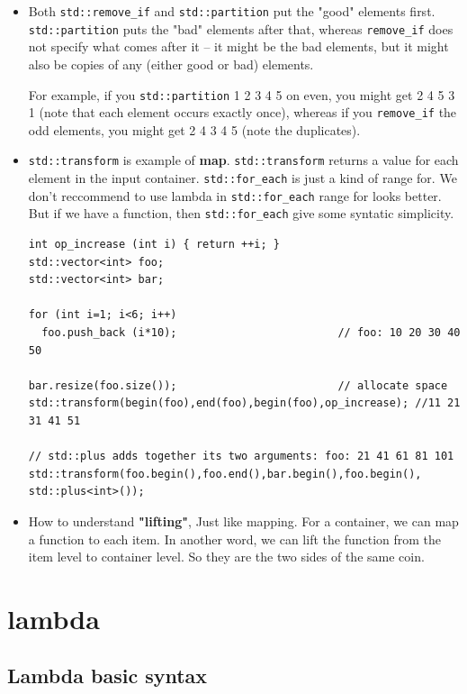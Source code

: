 \documentclass[a4paper,11pt,twoside]{book}
\begin{document}
\begin{itemize}
	\item  Both \texttt{std::remove\_if} and \texttt{std::partition} put the "good" elements first. \texttt{std::partition} puts the "bad" elements after that, whereas \texttt{remove\_if} does not specify what comes after it -- it might be the bad elements, but it might also be copies of any (either good or bad) elements.
	
	For example, if you \texttt{std::partition} 1 2 3 4 5 on even, you might get 2 4 5 3 1 (note that each element occurs exactly once), whereas if you \texttt{remove\_if} the odd elements, you might get 2 4 3 4 5 (note the duplicates).	


	\item \texttt{std::transform} is example of \textbf{map}. \texttt{std::transform} returns a value for each element in the input container. \texttt{std::for\_each} is just a kind of range for. We don't reccommend to use lambda in \texttt{std::for\_each}  range for looks better.  But if we have a function, then \texttt{std::for\_each} give some syntatic simplicity. 
\begin{lstlisting}
int op_increase (int i) { return ++i; }
std::vector<int> foo;
std::vector<int> bar;

for (int i=1; i<6; i++)
  foo.push_back (i*10);                         // foo: 10 20 30 40 50

bar.resize(foo.size());                         // allocate space
std::transform(begin(foo),end(foo),begin(foo),op_increase); //11 21 31 41 51
                                                  
// std::plus adds together its two arguments: foo: 21 41 61 81 101
std::transform(foo.begin(),foo.end(),bar.begin(),foo.begin(), std::plus<int>());
\end{lstlisting}

\item How to understand \textbf{"lifting"}, Just like mapping. For a container, we can map a function to each item. In another word, we can lift the function from the item level to container level. So they are the two sides of the same coin. 	
\end{itemize}

\section{lambda}
\subsection{Lambda basic syntax}
\end{document}
